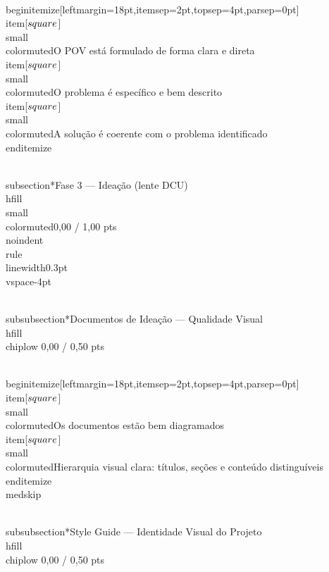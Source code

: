 \documentclass[11pt, a4paper]{article}
\newcommand{\chiplow}[1]{\colorbox{crimsondim}{\color{crimson}\semibold\small\strut\ #1\ }}
\begin{document}
\\begin{itemize}[leftmargin=18pt,itemsep=2pt,topsep=4pt,parsep=0pt]
  \\item[$\\square$] {\\small\\color{muted}O POV está formulado de forma clara e direta}
  \\item[$\\square$] {\\small\\color{muted}O problema é específico e bem descrito}
  \\item[$\\square$] {\\small\\color{muted}A solução é coerente com o problema identificado}
\\end{itemize}

\\subsection*{Fase 3 — Ideação (lente DCU) \\hfill {\\small\\color{muted}0,00 / 1,00 pts}}
\\noindent\\rule{\\linewidth}{0.3pt}\\vspace{-4pt}

\\subsubsection*{Documentos de Ideação — Qualidade Visual \\hfill {\\chiplow 0,00 / 0,50 pts}}

\\begin{itemize}[leftmargin=18pt,itemsep=2pt,topsep=4pt,parsep=0pt]
  \\item[$\\square$] {\\small\\color{muted}Os documentos estão bem diagramados}
  \\item[$\\square$] {\\small\\color{muted}Hierarquia visual clara: títulos, seções e conteúdo distinguíveis}
\\end{itemize}
\\medskip

\\subsubsection*{Style Guide — Identidade Visual do Projeto \\hfill {\\chiplow 0,00 / 0,50 pts}}
\end{document}
